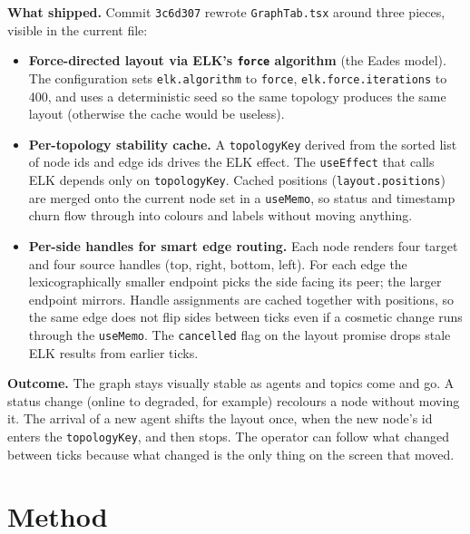\documentclass[11pt,a4paper]{article}
\begin{document}
\textbf{What shipped.} Commit \texttt{3c6d307} rewrote
\texttt{GraphTab.tsx} around three pieces, visible in the
current file:

\begin{itemize}[leftmargin=1.4em]
  \item \textbf{Force-directed layout via ELK's \texttt{force}
        algorithm} (the Eades model). The configuration sets
        \texttt{elk.algorithm} to \texttt{force},
        \texttt{elk.force.iterations} to 400, and uses a
        deterministic seed so the same topology produces the
        same layout (otherwise the cache would be useless).
  \item \textbf{Per-topology stability cache.} A
        \texttt{topologyKey} derived from the sorted list of node
        ids and edge ids drives the ELK effect. The
        \texttt{useEffect} that calls ELK depends only on
        \texttt{topologyKey}. Cached positions
        (\texttt{layout.positions}) are merged onto the current
        node set in a \texttt{useMemo}, so status and timestamp
        churn flow through into colours and labels without
        moving anything.
  \item \textbf{Per-side handles for smart edge routing.}
        Each node renders four target and four source handles
        (top, right, bottom, left). For each edge the
        lexicographically smaller endpoint picks the side
        facing its peer; the larger endpoint mirrors. Handle
        assignments are cached together with positions, so the
        same edge does not flip sides between ticks even if a
        cosmetic change runs through the
        \texttt{useMemo}. The \texttt{cancelled} flag on the
        layout promise drops stale ELK results from earlier
        ticks.
\end{itemize}

\textbf{Outcome.} The graph stays visually stable as agents and
topics come and go. A status change (online to degraded, for
example) recolours a node without moving it. The arrival of a
new agent shifts the layout once, when the new node's id enters
the \texttt{topologyKey}, and then stops. The operator can
follow what changed between ticks because what changed is the
only thing on the screen that moved.

\section{Method}
\end{document}
